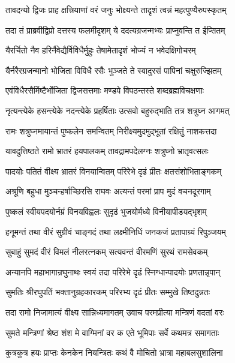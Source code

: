 \twolineshloka
{तावदन्यो द्विजः प्राह क्षत्त्रियाणां वरं जनुः}
{भोक्ष्यन्ते तादृशं त्वन्नं महत्पुण्यैरुपस्कृतम्}%

\twolineshloka
{तदा तं प्राब्रवीद्विप्रो दत्तस्य फलमीदृशम्}
{ये ददत्यग्रजन्मभ्यः प्राप्नुवन्ति त ईप्सितम्}%

\twolineshloka
{यैरर्चितो नैव हरिर्नैवेद्यैर्विविधैर्मुहुः}
{तेषामेतादृशं भोज्यं न भवेदक्षिगोचरम्}%

\twolineshloka
{यैर्नरैरग्रजन्मानो भोजिता विविधै रसैः}
{भुञ्जते ते स्वादुरसं पापिनां चक्षुरुज्झितम्}%

\twolineshloka
{एवंविधैरसैर्मिष्टैर्भोजिता द्विजसत्तमाः}
{मण्डपे विपठन्तस्ते शब्दब्रह्मविचक्षणाः}%

\twolineshloka
{नृत्यन्त्येके हसन्त्येके नदन्त्येके प्रहर्षिताः}
{उत्सवो बहुरुद्भाति तत्र शत्रुघ्न आगमत्}%

\twolineshloka
{रामः शत्रुघ्नमायान्तं पुष्कलेन समन्वितम्}
{निरीक्ष्यमुदमुद्भूतां रक्षितुं नाशकत्तदा}%

\twolineshloka
{यावदुत्तिष्ठते रामो भ्रातरं हयपालकम्}
{तावद्रामपदेलग्नः शत्रुघ्नो भ्रातृवत्सलः}%

\twolineshloka
{पादयोः पतितं वीक्ष्य भ्रातरं विनयान्वितम्}
{परिरेभे दृढं प्रीतः क्षतसंशोभिताङ्गकम्}%

\twolineshloka
{अश्रूणि बहुधा मुञ्चन्हर्षाच्छिरसि राघवः}
{अत्यन्तं परमां प्राप मुदं वचनदूरगाम्}%

\twolineshloka
{पुष्कलं स्वीयपदयोर्नम्रं विनयविह्वलः}
{सुदृढं भुजयोर्मध्ये विनीयापीडयद्भृशम्}%

\twolineshloka
{हनूमन्तं तथा वीरं सुग्रीवं चाङ्गदं तथा}
{लक्ष्मीनिधिं जनकजं प्रतापाग्र्यं रिपुञ्जयम्}%

\twolineshloka
{सुबाहुं सुमदं वीरं विमलं नीलरत्नकम्}
{सत्यवन्तं वीरमणिं सुरथं रामसेवकम्}%

\twolineshloka
{अन्यानपि महाभागान्रघुनाथः स्वयं तदा}
{परिरेभे दृढं स्निग्धान्पादयोः प्रणतान्नृपान्}%

\twolineshloka
{सुमतिः श्रीरघुपतिं भक्तानुग्रहकारकम्}
{परिरभ्य दृढं प्रीतः सम्मुखे तिष्ठदुन्नतः}%

\twolineshloka
{तदा रामो निजामात्यं वीक्ष्य सान्निध्यमागतम्}
{उवाच परमप्रीत्या मन्त्रिणं वदतां वरः}%

\twolineshloka
{सुमते मन्त्रिणां श्रेष्ठ शंश मे वाग्मिनां वर}
{क एते भूमिपाः सर्वे कथमत्र समागताः}%

\twolineshloka
{कुत्रकुत्र हयः प्राप्तः केनकेन नियन्त्रितः}
{कथं वै मोचितो भ्रात्रा महाबलसुशालिना}%

